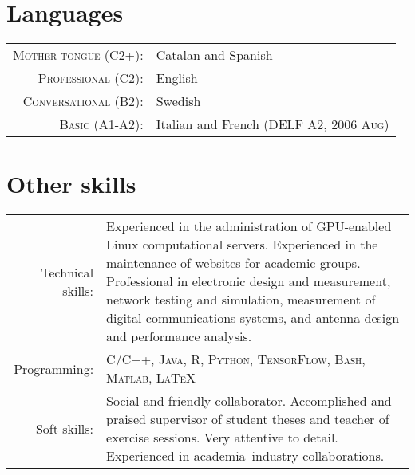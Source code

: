 \documentclass[a4paper,10pt]{article}
\begin{document}




\vspace{-10pt}

\section{Languages}

\begin{tabular}{rp{10cm}}

  \textsc{Mother tongue (C2+):} & Catalan and Spanish \\

  \textsc{Professional (C2):} & English \\

  \textsc{Conversational (B2):} & Swedish \\

  \textsc{Basic (A1-A2):} & Italian and French (\textsc{DELF} A2, \textsc{2006 Aug})

\end{tabular}


\vspace{-15pt}

\section{Other skills}

\begin{tabular}{rp{12cm}}
	Technical skills:  & Experienced in the administration of GPU-enabled Linux computational servers.
                       Experienced in the maintenance of websites for academic groups.
                       Professional in electronic design and measurement, network testing and
                       simulation, measurement of digital communications systems, and antenna design
                       and performance analysis. \vspace{5pt}\\
	Programming:       &  \textsc{C/C++, Java, R, Python, TensorFlow, Bash, Matlab, \LaTeX}  \vspace{5pt}\\
	Soft skills: 	   & Social and friendly collaborator. Accomplished and praised supervisor of
                     student theses and teacher of exercise sessions. Very attentive to
                     detail. Experienced in academia--industry collaborations.

\end{tabular}
\end{document}
